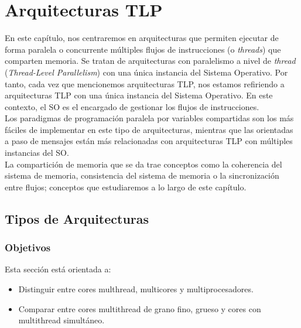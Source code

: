 \chapter{Arquitecturas TLP}
En este capítulo, nos centraremos en arquitecturas que permiten ejecutar de forma paralela o concurrente múltiples flujos de instrucciones (o \emph{threads}) que comparten memoria. Se tratan de arquitecturas con paralelismo a nivel de \emph{thread} (\emph{Thread-Level Parallelism}) con una única instancia del Sistema Operativo. Por tanto, cada vez que mencionemos arquitecturas TLP, nos estamos refiriendo a arquitecturas TLP con una única instancia del Sistema Operativo. En este contexto, el SO es el encargado de gestionar los flujos de instrucciones.\\

Los paradigmas de programación paralela por variables compartidas son los más fáciles de implementar en este tipo de arquitecturas, mientras que las orientadas a paso de mensajes están más relacionadas con arquitecturas TLP con múltiples instancias del SO\@.\\

La compartición de memoria que se da trae conceptos como la coherencia del sistema de memoria, consistencia del sistema de memoria o la sincronización entre flujos; conceptos que estudiaremos a lo largo de este capítulo.

\section{Tipos de Arquitecturas}
\subsection{Objetivos}
Esta sección está orientada a:
\begin{itemize}
    \item Distinguir entre cores multhread, multicores y multiprocesadores.
    \item Comparar entre cores multithread de grano fino, grueso y cores con multithread simultáneo.
\end{itemize}

